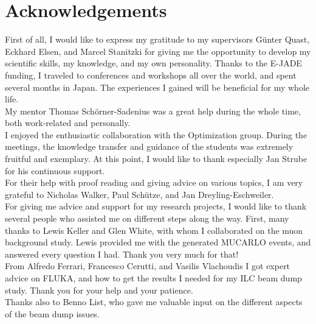 \chapter*{Acknowledgements}

First of all, I would like to express my gratitude to my supervisors G\"unter Quast, Eckhard Elsen, and Marcel Stanitzki for giving me the opportunity to develop my scientific skills, my knowledge, and my own personality.
Thanks to the E-JADE funding, I traveled to conferences and workshops all over the world, and spent several months in Japan.
The experiences I gained will be beneficial for my whole life.
\vspace*{0.2cm}\\
\noindent My mentor Thomas Sch\"orner-Sadenius was a great help during the whole time, both work-related and personally.
\vspace*{0.2cm}\\
\noindent I enjoyed the enthusiastic collaboration with the \sid Optimization group.
During the meetings, the knowledge transfer and guidance of the students was extremely fruitful and exemplary.
At this point, I would like to thank especially Jan Strube for his continuous support.
\vspace*{0.2cm}\\
\noindent For their help with proof reading and giving advice on various topics, I am very grateful to Nicholas Walker, Paul Sch\"utze, and Jan Dreyling-Eschweiler.
\vspace*{0.2cm}\\
\noindent For giving me advice and support for my research projects, I would like to thank several people who assisted me on different steps along the way.
First, many thanks to Lewis Keller and Glen White, with whom I collaborated on the muon background study.
Lewis provided me with the generated MUCARLO events, and answered every question I had.
Thank you very much for that!
\vspace*{0.2cm}\\
\noindent From Alfredo Ferrari, Francesco Cerutti, and Vasilis Vlachoudis I got expert advice on FLUKA, and how to get the results I needed for my ILC beam dump study.
Thank you for your help and your patience.
\\Thanks also to Benno List, who gave me valuable input on the different aspects of the beam dump issues.
